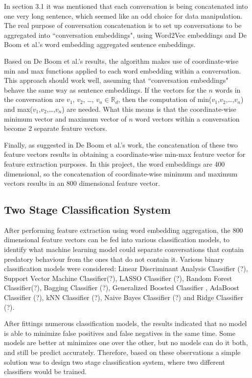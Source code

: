 \documentclass[11pt]{article}
\newcommand{\R}{\mathbb{R}}
\begin{document}
In section 3.1 it was mentioned that each conversation is being concatenated into one very long sentence, which seemed like an odd choice for data manipulation. The real purpose of conversation concatenation is to set up conversations to be aggregated into ``conversation embeddings", using Word2Vec embeddings and De Boom et al.'s word embedding aggregated sentence embeddings. 

Based on De Boom et al.'s results, the algorithm makes use of coordinate-wise min and max functions applied to each word embedding within a conversation. This approach should work well, assuming that ``conversation embeddings" behave the same way as sentence embeddings. If the vectors for the $n$ words in the conversation are $v_1$, $v_2$, \dots, $v_n \in \R_{d}$, then the computation of min($v_1$,$v_2$,\dots,$v_n$) and max($v_1$,$v_2$,\dots,$v_n$) are needed. What this means is that the coordinate-wise minimum vector and maximum vector of $n$ word vectors within a conversation become 2 separate feature vectors. 

Finally, as suggested in De Boom et al.'s work, the concatenation of these two feature vectors results in obtaining a coordinate-wise min-max feature vector for feature extraction purposes. In this project, the word embeddings are 400 dimensional, so the concatenation of coordinate-wise minimum and maximum vectors results in an 800 dimensional feature vector.

\subsection{Two Stage Classification System}
After performing feature extraction using word embedding aggregation, the 800 dimensional feature vectors can be fed into various classification models, to identify what machine learning model could separate conversations that contain predatory behaviour from the ones that do not contain it. Various binary classification models were considered: Linear Discriminant Analysis Classifier (?), Support Vector Machine Classifier(?), LASSO Classifier (?), Random Forest Classifier(?), Bagging Classifier (?), Generalized Boosted Classifier \cite{ridgeway2006gbm}, AdaBoost Classifier (?), kNN Classifier (?), Naive Bayes Classifier (?) and Ridge Classifier (?). 

After fittings numerous classification models, the results indicated that no model is able to minimize false positives and false negatives in the same time. Some models are better at minimizes one over the other, but no models can do it both, and still be predict accurately. Therefore, based on these observations a simple solution was to design two stage classification system, where two different classifiers would be trained.
\end{document}
